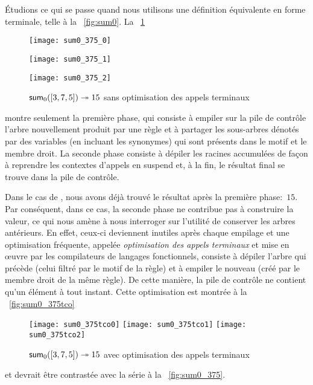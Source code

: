 Étudions ce qui se passe quand nous utilisons une définition
équivalente en forme terminale, telle  à la
\fig~\vref{fig:sum0}. La \fig~\ref{fig:sum0_375}
\begin{figure}[!t]
\centering
\texttt{[image: sum0\_375\_0]}

\texttt{[image: sum0\_375\_1]}

\texttt{[image: sum0\_375\_2]}
\caption{\(\textsf{sum}_0([3,7,5]) \twoheadrightarrow 15\)
  sans optimisation des appels terminaux}
\label{fig:sum0_375}
\end{figure}
montre seulement la première phase, qui consiste à empiler sur la pile
de contrôle l'arbre nouvellement produit par une règle et à partager
les sous-arbres dénotés par des variables (en incluant les synonymes)
qui sont présents dans le motif et le membre droit. La seconde phase
consiste à dépiler les racines accumulées de façon à reprendre les
contextes d'appels en suspend et, à la fin, le résultat final se
trouve dans la pile de contrôle.

Dans le cas de , nous avons déjà trouvé le résultat
après la première phase:~\(15\). Par conséquent, dans ce cas, la
seconde phase ne contribue pas à construire la valeur, ce qui nous
amène à nous interroger sur l'utilité de conserver les arbres
antérieurs. En effet, ceux-ci deviennent inutiles après chaque
empilage et une optimisation fréquente, appelée \emph{optimisation des
  appels terminaux} et mise en {\oe}uvre par les compilateurs de
langages fonctionnels, consiste à dépiler l'arbre qui précède (celui
filtré par le motif de la règle) et à empiler le nouveau (créé par le
membre droit de la même règle). De cette manière, la pile de contrôle
ne contient qu'un élément à tout instant. Cette optimisation est
montrée à la \fig~\vref{fig:sum0_375tco}
\begin{figure}[!t]
\centering
\texttt{[image: sum0\_375tco0]}
\texttt{[image: sum0\_375tco1]}
\texttt{[image: sum0\_375tco2]}
\caption{\(\textsf{sum}_0([3,7,5])
  \twoheadrightarrow 15\) avec optimisation des appels terminaux}
\label{fig:sum0_375tco}
\end{figure}
et devrait être contrastée avec la série à la \fig~\vref{fig:sum0_375}.

